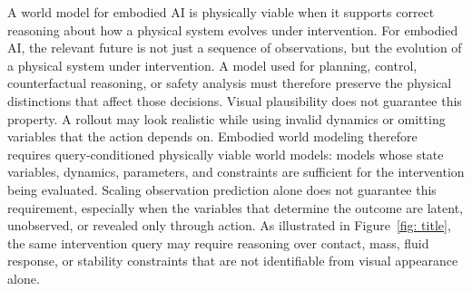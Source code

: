 \documentclass{article}
\begin{document}


A world model for embodied AI is physically viable when it supports correct reasoning about how a physical system evolves under intervention. For embodied AI, the relevant future is not just a sequence of observations, but the evolution of a physical system under intervention. A model used for planning, control, counterfactual reasoning, or safety analysis must therefore preserve the physical distinctions that affect those decisions. Visual plausibility does not guarantee this property. A rollout may look realistic while using invalid dynamics or omitting variables that the action depends on. Embodied world modeling therefore requires query-conditioned physically viable world models: models whose state variables, dynamics, parameters, and constraints are sufficient for the intervention being evaluated. Scaling observation prediction alone does not guarantee this requirement, especially when the variables that determine the outcome are latent, unobserved, or revealed only through action.
As illustrated in Figure~\ref{fig: title}, the same intervention query may require reasoning over contact, mass, fluid response, or stability constraints that are not identifiable from visual appearance alone.
\end{document}
